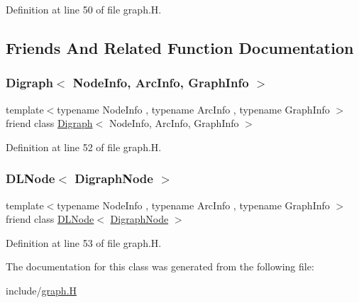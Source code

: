 Definition at line 50 of file graph.\+H.



\subsection{Friends And Related Function Documentation}
\mbox{\label{class_designar_1_1_digraph_node_abc8f370e4ec7084a6574cf967a5a5aaf}} 
\subsubsection{\texorpdfstring{Digraph$<$ Node\+Info, Arc\+Info, Graph\+Info $>$}{Digraph< NodeInfo, ArcInfo, GraphInfo >}}
{\footnotesize\ttfamily template$<$typename Node\+Info , typename Arc\+Info , typename Graph\+Info $>$ \\
friend class \hyperlink{class_designar_1_1_digraph}{Digraph}$<$ Node\+Info, Arc\+Info, Graph\+Info $>$\hspace{0.3cm}{\ttfamily [friend]}}



Definition at line 52 of file graph.\+H.

\mbox{\label{class_designar_1_1_digraph_node_a5532eb461a543edfe19acf97b74316fc}} 
\subsubsection{\texorpdfstring{D\+L\+Node$<$ Digraph\+Node $>$}{DLNode< DigraphNode >}}
{\footnotesize\ttfamily template$<$typename Node\+Info , typename Arc\+Info , typename Graph\+Info $>$ \\
friend class \hyperlink{class_designar_1_1_d_l_node}{D\+L\+Node}$<$ \hyperlink{class_designar_1_1_digraph_node}{Digraph\+Node} $>$\hspace{0.3cm}{\ttfamily [friend]}}



Definition at line 53 of file graph.\+H.



The documentation for this class was generated from the following file\+:\begin{DoxyCompactItemize}
\item 
include/\hyperlink{graph_8_h}{graph.\+H}\end{DoxyCompactItemize}
